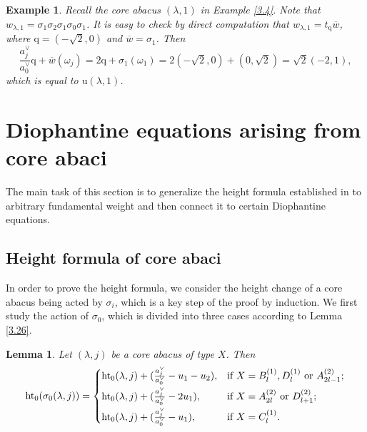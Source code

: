 \documentclass[11pt]{amsart}
\theoremstyle{plain}
\numberwithin{equation}{subsection}
\newtheorem{lemma}[theorem]{Lemma}
\newtheorem{example}[theorem]{Example}
\newcommand{\lam}{\lambda}
\begin{document}
\begin{example}\rm{
Recall the core abacus $(\lam, 1)$ in Example \ref{3.4}. Note that $w_{\lam, 1}=\sigma_1\sigma_2\sigma_1\sigma_0\sigma_1$. 
It is easy to check by direct computation  that $w_{\lam, 1}=t_{\mathrm{q}}\overline{w}$, 
where $\mathrm{q}=(-\sqrt{2}, 0)$ and $\overline{w}=\sigma_1$. Then
$$\frac{a_j^{\vee}}{a_0^{\vee}}\mathrm{q}+\overline{w}(\omega_{j})=2\mathrm{q}+\sigma_1(\omega_{1})=2(-\sqrt{2},0)+(0,\sqrt{2})=\sqrt{2}(-2,1),$$ 
which is equal to $\mathrm{u}(\lam, 1)$.
}
\end{example}

\bigskip


\section{Diophantine equations arising from core abaci}

The main task of this section is to generalize the height formula established in \cite{STW}
to arbitrary fundamental weight and then connect it to certain Diophantine equations.


\subsection{Height formula of core abaci}

In order to prove the height formula, we consider the height change of a core abacus being acted by $\sigma_i$, 
which is a key step of the proof by induction.
We first study the action of $\sigma_0$, which is divided into three cases according to Lemma \ref{3.26}.

\begin{lemma}\label{4.1}
Let $(\lam, j)$ be a core abacus of type $X$.
Then $${\rm ht}_0(\sigma_{0}(\lambda,j))=
\begin{cases}
\smallskip
{\rm ht}_0(\lambda,j)+(\frac{a_j^{\vee}}{a_0^{\vee}}-u_{1}-u_2), & \text{\rm if $X=B_l^{(1)}, D_l^{(1)}$ or $A_{2l-1}^{(2)}$};\\
\smallskip
{\rm ht}_0(\lambda,j)+(\frac{a_j^{\vee}}{a_0^{\vee}}-2u_{1}), & \text{\rm if $X=A_{2l}^{(2)}$ or $D_{l+1}^{(2)}$};\\
{\rm ht}_0(\lambda,j)+(\frac{a_j^{\vee}}{a_0^{\vee}}-u_{1}), & \text{\rm if $X= C_l^{(1)}$}.
\end{cases}
$$ 
\end{lemma}
\end{document}
